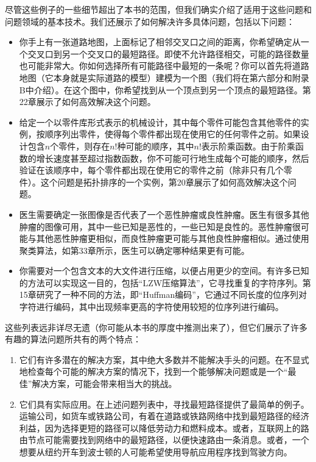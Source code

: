 \documentclass[lang=cn,newtx,10pt,scheme=chinese]{elegantbook}
\begin{document}
尽管这些例子的一些细节超出了本书的范围，但我们确实介绍了适用于这些问题和问题领域的基本技术。我们还展示了如何解决许多具体问题，包括以下问题：

\begin{itemize}
    \item 你手上有一张道路地图，上面标记了相邻交叉口之间的距离，你希望确定从一个交叉口到另一个交叉口的最短路径。即使不允许路径相交，可能的路径数量也可能非常大。你如何选择所有可能路径中最短的一条呢？你可以首先将道路地图（它本身就是实际道路的模型）建模为一个图（我们将在第六部分和附录B中介绍）。在这个图中，你希望找到从一个顶点到另一个顶点的最短路径。第22章展示了如何高效解决这个问题。
    \item 给定一个以零件库形式表示的机械设计，其中每个零件可能包含其他零件的实例，按顺序列出零件，使得每个零件都出现在使用它的任何零件之前。如果设计包含$n$个零件，则存在$n!$种可能的顺序，其中$n!$表示阶乘函数。由于阶乘函数的增长速度甚至超过指数函数，你不可能可行地生成每个可能的顺序，然后验证在该顺序中，每个零件都出现在使用它的零件之前（除非只有几个零件）。这个问题是拓扑排序的一个实例，第20章展示了如何高效解决这个问题。
    \item 医生需要确定一张图像是否代表了一个恶性肿瘤或良性肿瘤。医生有很多其他肿瘤的图像可用，其中一些已知是恶性的，一些已知是良性的。恶性肿瘤很可能与其他恶性肿瘤更相似，而良性肿瘤更可能与其他良性肿瘤相似。通过使用聚类算法，如第33章所示，医生可以确定哪种结果更有可能。
    \item 你需要对一个包含文本的大文件进行压缩，以便占用更少的空间。有许多已知的方法可以实现这一目的，包括``LZW压缩算法''，它寻找重复的字符序列。第15章研究了一种不同的方法，即``Huffman编码''，它通过不同长度的位序列对字符进行编码，其中出现频率更高的字符使用较短的位序列进行编码。
\end{itemize}

这些列表远非详尽无遗（你可能从本书的厚度中推测出来了），但它们展示了许多有趣的算法问题所共有的两个特点：

\begin{enumerate}
    \item 它们有许多潜在的解决方案，其中绝大多数并不能解决手头的问题。在不显式地检查每个可能的解决方案的情况下，找到一个能够解决问题或是一个``最佳''解决方案，可能会带来相当大的挑战。
    \item 它们具有实际应用。在上述问题列表中，寻找最短路径提供了最简单的例子。运输公司，如货车或铁路公司，有着在道路或铁路网络中找到最短路径的经济利益，因为选择更短的路径可以降低劳动力和燃料成本。或者，互联网上的路由节点可能需要找到网络中的最短路径，以便快速路由一条消息。或者，一个想要从纽约开车到波士顿的人可能希望使用导航应用程序找到驾驶方向。
\end{enumerate}
\end{document}
